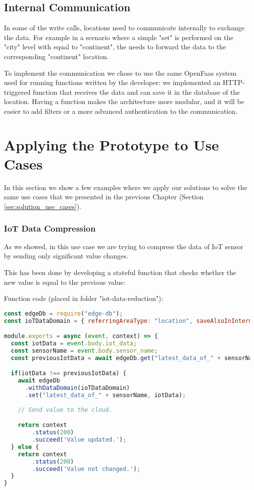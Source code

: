 \subsection{Internal Communication}
In some of the write calls, locations need to communicate internally to exchange the data. For example in a scenario where a simple "set" is performed on the "city" level with  equal to "continent", the  needs to forward the data to the corresponding "continent" location.

To implement the communication we chose to use the same OpenFaas system used for running functions written by the developer: we implemented an HTTP-triggered function that receives the data and can save it in the database of the location.
Having a function makes the architecture more modular, and it will be easier to add filters or a more advanced authentication to the communication.


\section{Applying the Prototype to Use Cases}
\label{sec:prototype_applying_to_use_cases}
In this section we show a few examples where we apply our solutions to solve the same use cases that we presented in the previous Chapter (Section \ref{sec:solution_use_cases}).

\subsubsection{IoT Data Compression}
As we showed, in this use case we are trying to compress the data of IoT sensor by sending only significant value changes.

This has been done by developing a stateful function that checks whether the new value is equal to the previous value:

Function code (placed in folder "iot-data-reduction"):
\begin{lstlisting}[language=javascript]
const edgeDb = require("edge-db");
const ioTDataDomain = { referringAreaType: "location", saveAlsoInIntermediateLevels: false, ttl: 5*24*60*60*1000 }; // 5 days TTL.

module.exports = async (event, context) => {
  const iotData = event.body.iot_data;
  const sensorName = event.body.sensor_name;
  const previousIotData = await edgeDb.get("latest_data_of_" + sensorName);

  if(iotData !== previousIotData) {
    await edgeDb
      .withDataDomain(ioTDataDomain)
      .set("latest_data_of_" + sensorName, iotData);
        
    // Send value to the cloud.

    return context
        .status(200)
        .succeed('Value updated.');
  } else {
    return context
        .status(200)
        .succeed('Value not changed.');
  }
}
\end{lstlisting}


